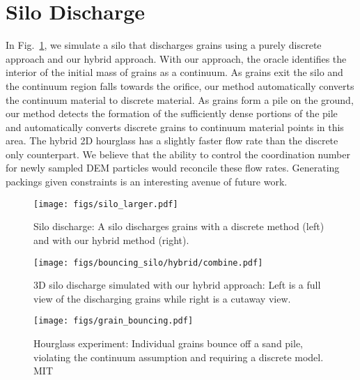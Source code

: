 \section{Silo Discharge}
In Fig.~\ref{fig:hybrid:silo_discharge}, we simulate a silo that discharges grains 
using a purely discrete approach and our hybrid approach.
With our approach, the oracle identifies the interior of the
initial mass of grains as a continuum. As grains exit the silo and the continuum region falls towards the orifice, our
method automatically converts the continuum material to discrete material. As grains form a pile on the ground, our
method detects the formation of the sufficiently dense portions of the pile and automatically converts discrete grains
to continuum material points in this area.
The hybrid 2D hourglass has a slightly faster flow rate than the discrete only counterpart. We believe that the ability to control the coordination number for newly sampled DEM particles would reconcile these flow rates. Generating packings given constraints is an interesting avenue of future work.

\begin{figure}
  \centering
  \texttt{[image: figs/silo\_larger.pdf]}
  \caption{
    Silo discharge: A silo discharges grains with a discrete method (left) and with our hybrid method (right).
  }
  \label{fig:hybrid:silo_discharge}
\end{figure}

\begin{figure}
  \centering
  \texttt{[image: figs/bouncing\_silo/hybrid/combine.pdf]}
  \caption{
    3D silo discharge simulated with our hybrid approach: Left is a full view of the discharging grains while right is a cutaway view.
  }
  \label{fig:hybrid:silo_discharge_3d}
\end{figure}

\begin{figure}
  \centering
  \texttt{[image: figs/grain\_bouncing.pdf]}
  \caption{
    Hourglass experiment: Individual grains bounce off a sand pile, violating the continuum assumption and requiring a discrete model. \textcopyright MIT
  }
  \label{fig:hybrid:grain_bouncing}
\end{figure}

